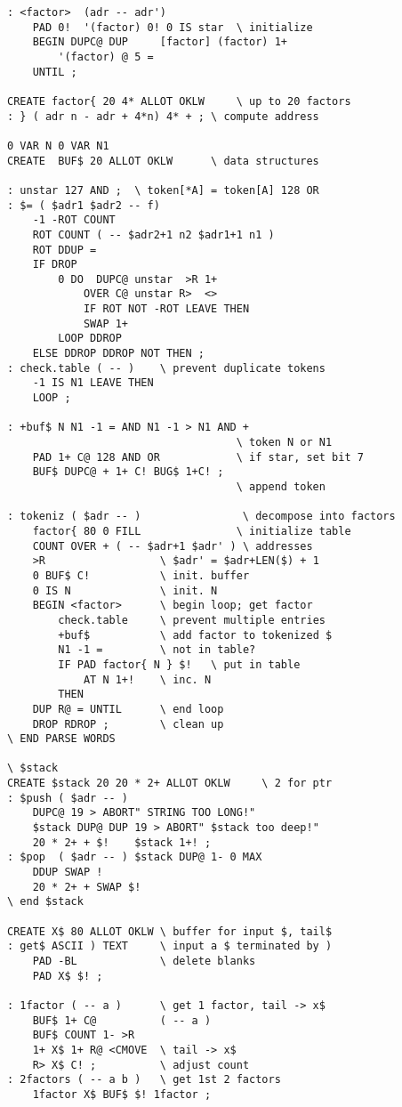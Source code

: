 \begin{lstlisting}
: <factor>  (adr -- adr')
    PAD 0!  '(factor) 0! 0 IS star  \ initialize
    BEGIN DUPC@ DUP     [factor] (factor) 1+
        '(factor) @ 5 =
    UNTIL ;

CREATE factor{ 20 4* ALLOT OKLW     \ up to 20 factors
: } ( adr n - adr + 4*n) 4* + ; \ compute address

0 VAR N 0 VAR N1
CREATE  BUF$ 20 ALLOT OKLW      \ data structures

: unstar 127 AND ;  \ token[*A] = token[A] 128 OR
: $= ( $adr1 $adr2 -- f)
    -1 -ROT COUNT
    ROT COUNT ( -- $adr2+1 n2 $adr1+1 n1 )
    ROT DDUP =
    IF DROP
        0 DO  DUPC@ unstar  >R 1+
            OVER C@ unstar R>  <>
            IF ROT NOT -ROT LEAVE THEN
            SWAP 1+
        LOOP DDROP
    ELSE DDROP DDROP NOT THEN ;
: check.table ( -- )    \ prevent duplicate tokens
    -1 IS N1 LEAVE THEN
    LOOP ;

: +buf$ N N1 -1 = AND N1 -1 > N1 AND +
                                    \ token N or N1
    PAD 1+ C@ 128 AND OR            \ if star, set bit 7
    BUF$ DUPC@ + 1+ C! BUG$ 1+C! ;
                                    \ append token

: tokeniz ( $adr -- )                \ decompose into factors
    factor{ 80 0 FILL               \ initialize table
    COUNT OVER + ( -- $adr+1 $adr' ) \ addresses
    >R                  \ $adr' = $adr+LEN($) + 1
    0 BUF$ C!           \ init. buffer
    0 IS N              \ init. N
    BEGIN <factor>      \ begin loop; get factor
        check.table     \ prevent multiple entries
        +buf$           \ add factor to tokenized $
        N1 -1 =         \ not in table?
        IF PAD factor{ N } $!   \ put in table
            AT N 1+!    \ inc. N
        THEN
    DUP R@ = UNTIL      \ end loop
    DROP RDROP ;        \ clean up
\ END PARSE WORDS

\ $stack
CREATE $stack 20 20 * 2+ ALLOT OKLW     \ 2 for ptr
: $push ( $adr -- )
    DUPC@ 19 > ABORT" STRING TOO LONG!"
    $stack DUP@ DUP 19 > ABORT" $stack too deep!"
    20 * 2+ + $!    $stack 1+! ;
: $pop  ( $adr -- ) $stack DUP@ 1- 0 MAX
    DDUP SWAP !
    20 * 2+ + SWAP $!
\ end $stack

CREATE X$ 80 ALLOT OKLW \ buffer for input $, tail$
: get$ ASCII ) TEXT     \ input a $ terminated by )
    PAD -BL             \ delete blanks
    PAD X$ $! ;

: 1factor ( -- a )      \ get 1 factor, tail -> x$
    BUF$ 1+ C@          ( -- a )
    BUF$ COUNT 1- >R
    1+ X$ 1+ R@ <CMOVE  \ tail -> x$
    R> X$ C! ;          \ adjust count
: 2factors ( -- a b )   \ get 1st 2 factors
    1factor X$ BUF$ $! 1factor ;


\end{lstlisting}
